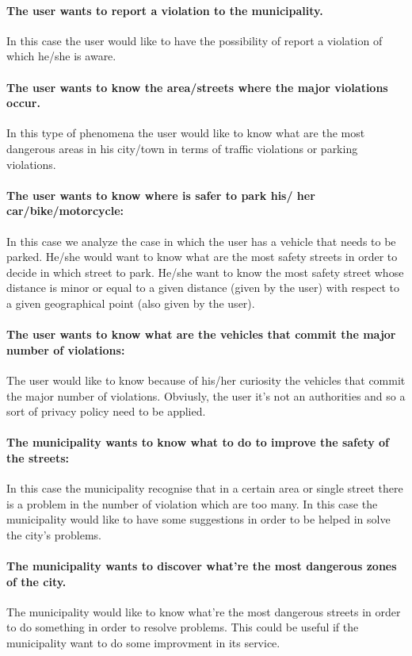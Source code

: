 \documentclass[titlepage]{article}
\begin{document}
\paragraph{The user wants to report a violation to the 					  municipality.}
In this case the user would like to have the possibility of report a violation of which he/she is aware. 
\paragraph{The user wants to know the area/streets where the 
	      major violations occur.}
In this type of phenomena the user would like to know what are the most dangerous areas in his city/town in terms of traffic violations or parking violations. 
\paragraph{The user wants to know where is safer to park his/			  her car/bike/motorcycle:}
In this case we analyze the case in which the user has a vehicle that needs to be parked. He/she would want to know what are the most safety streets in order to decide in which street to park. He/she want to know the most safety street whose distance is minor or equal to a given distance (given by the user) with respect to a given geographical point (also given by the user).
\paragraph{The user wants to know what are the vehicles that       		  commit the major number of violations:}
The user would like to know because of his/her curiosity the vehicles that commit the major number of violations. Obviusly, the user it's not an authorities and so a sort of privacy policy need to be applied.
\paragraph{The municipality wants to know what to do to 				improve the safety of the streets: }
In this case the municipality recognise that in a certain area or single street there is a problem in the number of violation which are too many. In this case the municipality would like to have some suggestions in order to be helped in solve the city's problems.
\paragraph{The municipality wants to discover what're the most dangerous zones of the city.}
The municipality would like to know what're the most dangerous streets in order to do something in order to resolve problems. This could be useful if the municipality want to do some improvment in its service.
\end{document}
